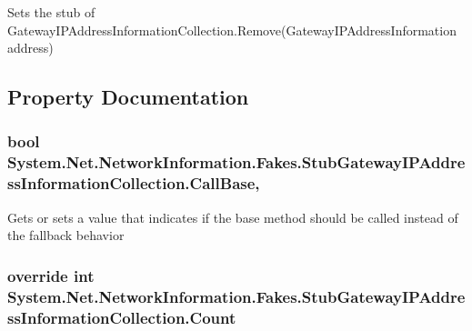 Sets the stub of Gateway\-I\-P\-Address\-Information\-Collection.\-Remove(\-Gateway\-I\-P\-Address\-Information address)



\subsection{Property Documentation}
\hypertarget{class_system_1_1_net_1_1_network_information_1_1_fakes_1_1_stub_gateway_i_p_address_information_collection_aa13e361113aad14186c593b5c6a07107}{
\subsubsection[{Call\-Base}]{\setlength{\rightskip}{0pt plus 5cm}bool System.\-Net.\-Network\-Information.\-Fakes.\-Stub\-Gateway\-I\-P\-Address\-Information\-Collection.\-Call\-Base\hspace{0.3cm}{\ttfamily [get]}, {\ttfamily [set]}}}\label{class_system_1_1_net_1_1_network_information_1_1_fakes_1_1_stub_gateway_i_p_address_information_collection_aa13e361113aad14186c593b5c6a07107}


Gets or sets a value that indicates if the base method should be called instead of the fallback behavior

\hypertarget{class_system_1_1_net_1_1_network_information_1_1_fakes_1_1_stub_gateway_i_p_address_information_collection_afcd2cb4b2c65504719546123ab4c689e}{
\subsubsection[{Count}]{\setlength{\rightskip}{0pt plus 5cm}override int System.\-Net.\-Network\-Information.\-Fakes.\-Stub\-Gateway\-I\-P\-Address\-Information\-Collection.\-Count\hspace{0.3cm}{\ttfamily [get]}}}\label{class_system_1_1_net_1_1_network_information_1_1_fakes_1_1_stub_gateway_i_p_address_information_collection_afcd2cb4b2c65504719546123ab4c689e}


